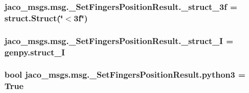 \subsubsection[{\texorpdfstring{\+\_\+struct\+\_\+3f}{_struct_3f}}]{\setlength{\rightskip}{0pt plus 5cm}jaco\+\_\+msgs.\+msg.\+\_\+\+Set\+Fingers\+Position\+Result.\+\_\+struct\+\_\+3f = struct.\+Struct(\char`\"{}$<$3f\char`\"{})\hspace{0.3cm}{\ttfamily [private]}}\hypertarget{namespacejaco__msgs_1_1msg_1_1__SetFingersPositionResult_a9f9793818aa38239912b24576e43e94f}{}\label{namespacejaco__msgs_1_1msg_1_1__SetFingersPositionResult_a9f9793818aa38239912b24576e43e94f}
\subsubsection[{\texorpdfstring{\+\_\+struct\+\_\+I}{_struct_I}}]{\setlength{\rightskip}{0pt plus 5cm}jaco\+\_\+msgs.\+msg.\+\_\+\+Set\+Fingers\+Position\+Result.\+\_\+struct\+\_\+I = genpy.\+struct\+\_\+I\hspace{0.3cm}{\ttfamily [private]}}\hypertarget{namespacejaco__msgs_1_1msg_1_1__SetFingersPositionResult_afa4c6324a89a098423459ee53c9988ff}{}\label{namespacejaco__msgs_1_1msg_1_1__SetFingersPositionResult_afa4c6324a89a098423459ee53c9988ff}
\subsubsection[{\texorpdfstring{python3}{python3}}]{\setlength{\rightskip}{0pt plus 5cm}bool jaco\+\_\+msgs.\+msg.\+\_\+\+Set\+Fingers\+Position\+Result.\+python3 = True}\hypertarget{namespacejaco__msgs_1_1msg_1_1__SetFingersPositionResult_a2a8fd012a0fe75c8d72d36c6695d85ef}{}\label{namespacejaco__msgs_1_1msg_1_1__SetFingersPositionResult_a2a8fd012a0fe75c8d72d36c6695d85ef}

